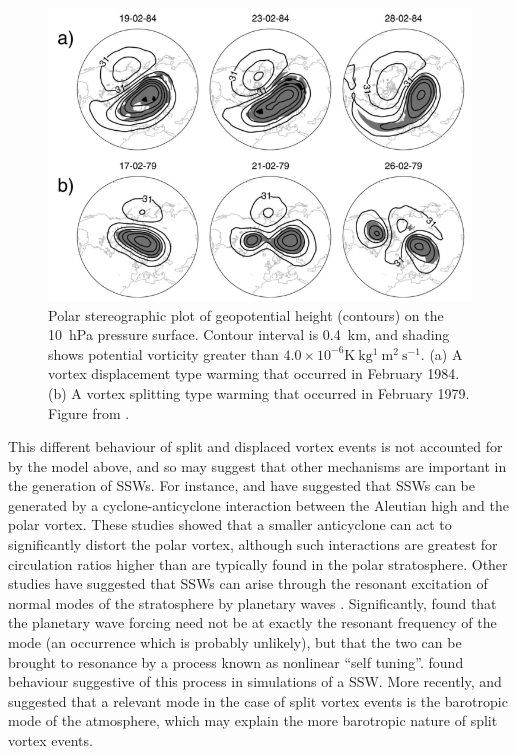 \begin{figure}
 \centering
 \noindent\includegraphics[width=\textwidth]{figures/chapter-intro/charlton_polvani_SSW.png}
 \caption[Examples of a split and displaced vortex event from
 \citet{Charlton2007a}]{Polar stereographic plot of geopotential height
   (contours) on the 10~hPa pressure surface. Contour interval is 0.4~km, and
   shading shows potential vorticity greater than
   $4.0 \times 10^{-6} \mathrm{K~kg^1~m^2~s^{-1}}$. (a) A vortex displacement
   type warming that occurred in February 1984. (b) A vortex splitting type
   warming that occurred in February 1979. Figure from \citet{Charlton2007}.}
 \label{fig:charlton_polvani_ssw}
\end{figure}

This different behaviour of split and displaced vortex events is not accounted
for by the \citet{Matsuno1970, Matsuno1971} model above, and so may suggest that
other mechanisms are important in the generation of SSWs. For instance,
\citet{ONeill1988} and \citet{Scott2006} have suggested that SSWs can be
generated by a cyclone-anticyclone interaction between the Aleutian high and the
polar vortex. These studies showed that a smaller anticyclone can act to
significantly distort the polar vortex, although such interactions are greatest
for circulation ratios higher than are typically found in the polar
stratosphere. Other studies have suggested that SSWs can arise through the
resonant excitation of normal modes of the stratosphere by planetary waves
\citep{Tung1979}. Significantly, \citet{Plumb1981} found that the planetary wave
forcing need not be at exactly the resonant frequency of the mode (an occurrence
which is probably unlikely), but that the two can be brought to resonance by a
process known as nonlinear ``self tuning''. \citet{Smith1989} found behaviour
suggestive of this process in simulations of a SSW. More recently,
\citet{Esler2005} and \citet{Esler2006} suggested that a relevant mode in the
case of split vortex events is the barotropic mode of the atmosphere, which may
explain the more barotropic nature of split vortex events.

